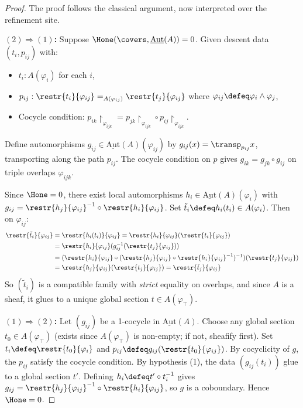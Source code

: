 \begin{proof}
The proof follows the classical argument, now interpreted over the
refinement site.

\textbf{$(2) \Rightarrow (1)$:}
Suppose $\Hone(\covers, \underline{\mathrm{Aut}}(A)) = 0$.  Given descent
data $(t_i, p_{ij})$ with:
\begin{itemize}
\item $t_i : A(\varphi_i)$ for each $i$,
\item $p_{ij} : \restr{t_i}{\varphi_{ij}} =_{A(\varphi_{ij})}
  \restr{t_j}{\varphi_{ij}}$ where $\varphi_{ij} \defeq \varphi_i
  \wedge \varphi_j$,
\item Cocycle condition: $p_{ik}\!\!\restriction_{\varphi_{ijk}} =
  p_{jk}\!\!\restriction_{\varphi_{ijk}} \circ
  p_{ij}\!\!\restriction_{\varphi_{ijk}}$.
\end{itemize}
Define automorphisms $g_{ij} \in \underline{\mathrm{Aut}}(A)(\varphi_{ij})$
by $g_{ij}(x) = \transp_{p_{ij}} x$, transporting along the path $p_{ij}$.
The cocycle condition on $p$ gives $g_{ik} = g_{jk} \circ g_{ij}$ on
triple overlaps $\varphi_{ijk}$.

Since $\Hone = 0$, there exist local automorphisms $h_i \in
\underline{\mathrm{Aut}}(A)(\varphi_i)$ with
$g_{ij} = \restr{h_j}{\varphi_{ij}}^{-1} \circ \restr{h_i}{\varphi_{ij}}$.
Set $\tilde{t}_i \defeq h_i(t_i) \in A(\varphi_i)$.  Then on
$\varphi_{ij}$:
\begin{align*}
  \restr{\tilde{t}_i}{\varphi_{ij}}
  &= \restr{h_i(t_i)}{\varphi_{ij}}
  = \restr{h_i}{\varphi_{ij}}(\restr{t_i}{\varphi_{ij}}) \\
  &= \restr{h_i}{\varphi_{ij}}(g_{ij}^{-1}(\restr{t_j}{\varphi_{ij}})) \\
  &= (\restr{h_i}{\varphi_{ij}} \circ
    (\restr{h_j}{\varphi_{ij}} \circ \restr{h_i}{\varphi_{ij}}^{-1})^{-1})
    (\restr{t_j}{\varphi_{ij}}) \\
  &= \restr{h_j}{\varphi_{ij}}(\restr{t_j}{\varphi_{ij}})
  = \restr{\tilde{t}_j}{\varphi_{ij}}
\end{align*}
So $(\tilde{t}_i)$ is a compatible family with \emph{strict} equality on
overlaps, and since $A$ is a sheaf, it glues to a unique global section
$t \in A(\varphi_\top)$.

\textbf{$(1) \Rightarrow (2)$:}
Let $(g_{ij})$ be a 1-cocycle in $\underline{\mathrm{Aut}}(A)$.  Choose
any global section $t_0 \in A(\varphi_\top)$ (exists since
$A(\varphi_\top)$ is non-empty; if not, sheafify first).  Set
$t_i \defeq \restr{t_0}{\varphi_i}$ and
$p_{ij} \defeq g_{ij}(\restr{t_0}{\varphi_{ij}})$.
By cocyclicity of $g$, the $p_{ij}$ satisfy the cocycle condition.
By hypothesis (1), the data $(g_{ij}(t_i))$ glue to a global section $t'$.
Defining $h_i \defeq t' \circ t_i^{-1}$ gives
$g_{ij} = \restr{h_j}{\varphi_{ij}}^{-1} \circ \restr{h_i}{\varphi_{ij}}$,
so $g$ is a coboundary.  Hence $\Hone = 0$.
\end{proof}

